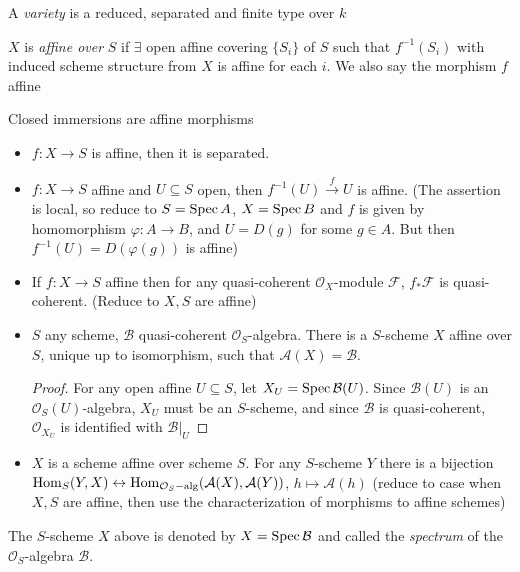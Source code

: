 \documentclass[main]{subfiles}
\begin{document}
\begin{definition}
A \textit{variety} is a reduced, separated and finite type over $k$
\end{definition}

\begin{definition}
$X$ is \textit{affine over} $S$ if $\exists$ open affine covering $\{S_i\}$ of $S$ such that $f^{-1}(S_i)$ with induced scheme structure from $X$ is affine for each $i$. We also say the morphism $f$ affine
\end{definition}

\begin{example}
Closed immersions are affine morphisms
\end{example}

\begin{itemize}
\item $f:X\to S$ is affine, then it is separated.
\item $f:X\to S$ affine and $U\subseteq S$ open, then $f^{-1}(U)\xrightarrow{f}U$ is affine. (The assertion is local, so reduce to $S=\operatorname{Spec} A$, $X=\operatorname{Spec} B$ and $f$ is given by homomorphism $\varphi:A\to B$, and $U=D(g)$ for some $g\in A$. But then $f^{-1}(U)=D(\varphi(g))$ is affine)
\item If $f:X\to S$ affine then for any quasi-coherent $\mathcal O_X$-module $\mathcal F$, $f_*\mathcal F$ is quasi-coherent. (Reduce to $X,S$ are affine)
\item $S$ any scheme, $\mathcal B$ quasi-coherent $\mathcal O_S$-algebra. There is a $S$-scheme $X$ affine over $S$, unique up to isomorphism, such that $\mathcal A(X)=\mathcal B$.
\begin{proof}
For any open affine $U\subseteq S$, let $X_U=\operatorname{Spec} \mathcal B(U)$. Since $\mathcal B(U)$ is an $\mathcal O_S(U)$-algebra, $X_U$ must be an $S$-scheme, and since $\mathcal B$ is quasi-coherent, $\mathcal O_{X_U}$ is identified with $\mathcal B|_U$
\end{proof}
\item $X$ is a scheme affine over scheme $S$. For any $S$-scheme $Y$ there is a bijection $\operatorname{Hom}_S(Y,X)\leftrightarrow\operatorname{Hom}_{\mathcal O_S-\text{alg}}(\mathcal A(X),\mathcal A(Y))$, $h\mapsto\mathcal A(h)$ (reduce to case when $X,S$ are affine, then use the characterization of morphisms to affine schemes)
\end{itemize}

\begin{definition}
The $S$-scheme $X$ above is denoted by $X=\operatorname{Spec}\mathcal B$ and called the \textit{spectrum} of the $\mathcal O_S$-algebra $\mathcal B$.
\end{definition}
\end{document}
